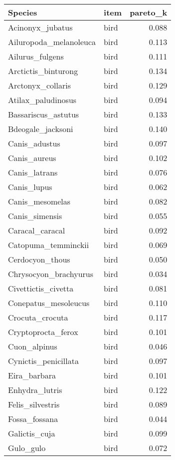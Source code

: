 \begin{table}
\centering
\begin{tabular}[t]{l|l|r}
\hline
Species & item & pareto\_k\\
\hline
Acinonyx\_jubatus & bird & 0.088\\
\hline
Ailuropoda\_melanoleuca & bird & 0.113\\
\hline
Ailurus\_fulgens & bird & 0.111\\
\hline
Arctictis\_binturong & bird & 0.134\\
\hline
Arctonyx\_collaris & bird & 0.129\\
\hline
Atilax\_paludinosus & bird & 0.094\\
\hline
Bassariscus\_astutus & bird & 0.133\\
\hline
Bdeogale\_jacksoni & bird & 0.140\\
\hline
Canis\_adustus & bird & 0.097\\
\hline
Canis\_aureus & bird & 0.102\\
\hline
Canis\_latrans & bird & 0.076\\
\hline
Canis\_lupus & bird & 0.062\\
\hline
Canis\_mesomelas & bird & 0.082\\
\hline
Canis\_simensis & bird & 0.055\\
\hline
Caracal\_caracal & bird & 0.092\\
\hline
Catopuma\_temminckii & bird & 0.069\\
\hline
Cerdocyon\_thous & bird & 0.050\\
\hline
Chrysocyon\_brachyurus & bird & 0.034\\
\hline
Civettictis\_civetta & bird & 0.081\\
\hline
Conepatus\_mesoleucus & bird & 0.110\\
\hline
Crocuta\_crocuta & bird & 0.117\\
\hline
Cryptoprocta\_ferox & bird & 0.101\\
\hline
Cuon\_alpinus & bird & 0.046\\
\hline
Cynictis\_penicillata & bird & 0.097\\
\hline
Eira\_barbara & bird & 0.101\\
\hline
Enhydra\_lutris & bird & 0.122\\
\hline
Felis\_silvestris & bird & 0.089\\
\hline
Fossa\_fossana & bird & 0.044\\
\hline
Galictis\_cuja & bird & 0.099\\
\hline
Gulo\_gulo & bird & 0.072\\

\end{tabular}
\end{table}
